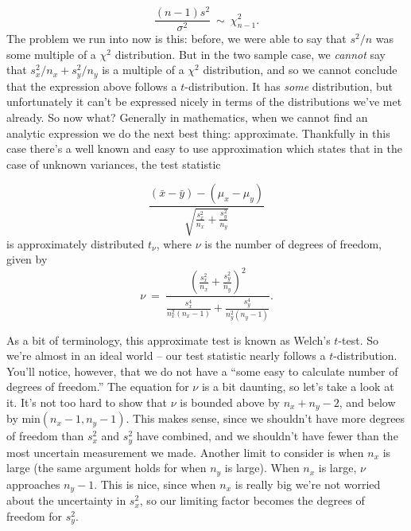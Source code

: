 \begin{equation*}
\frac{\left(n-1\right)s^2}{\sigma^2} \ \sim \  \chi^2_{n-1}.
\end{equation*}
The problem we run into now is this: before, we were able to say that $s^2/n$ was some multiple of a $\chi^2$ distribution.  But in the two sample case, we \emph{cannot} say that $s^2_x/n_x + s^2_y/n_y$ is a multiple of a $\chi^2$ distribution, and so we cannot conclude that the expression above follows a $t$-distribution.  It has \emph{some} distribution, but unfortunately it can't be expressed nicely in terms of the  distributions we've met already.  So now what?  Generally in mathematics, when we cannot find an analytic expression we do the next best thing: approximate.  Thankfully in this case there's a well known and easy to use approximation which states that in the case of unknown variances,   the test statistic

\begin{equation*}
\frac{\left(\bar{x}-\bar{y}\right)-\left(\mu_x - \mu_y\right)}{\sqrt{\frac{s^2_x}{n_x} + \frac{s^2_y}{n_y}}}
\end{equation*}
is approximately distributed $t_\nu$, where $\nu$ is the number of degrees of freedom, given by
\begin{equation*}
\nu\ =\ \frac{\left(\frac{s^2_x}{n_x} + \frac{s^2_y}{n_y}\right)^2}{\frac{s^4_x}{n^2_x\left(n_x - 1\right)} + \frac{s^4_y}{n^2_y\left(n_y - 1\right)}}.
\end{equation*}

As a bit of terminology, this approximate test is known as Welch's $t$-test.  So we're almost in an ideal world -- our test statistic nearly follows a $t$-distribution.  You'll notice, however, that we do not have a ``some easy to calculate number of degrees of freedom.''  The equation for $\nu$ is a bit daunting, so let's take a look at it.  It's not too hard to show that $\nu$ is bounded above by $n_x + n_y - 2$, and below by $\textrm{min}(n_x - 1, n_y - 1)$.  This makes sense, since we shouldn't have more degrees of freedom than $s^2_x$ and $s^2_y$ have combined, and we shouldn't have fewer than the most uncertain measurement we made.  Another limit to consider is when $n_x$ is large (the same argument holds for when $n_y$ is large).  When $n_x$ is large, $\nu$ approaches $n_y - 1$.  This is nice, since when $n_x$ is really big we're not worried about the uncertainty in $s^2_x$, so our limiting factor becomes the degrees of freedom for $s^2_y$.

